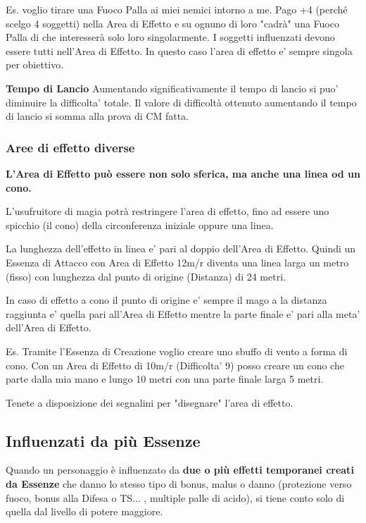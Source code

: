 \documentclass[a4paper,11pt,twoside,openany]{book}
\begin{document}
Es. voglio tirare una Fuoco Palla ai miei nemici intorno a me. Pago +4 (perché scelgo 4 soggetti) nella Area di Effetto e su ognuno di loro "cadrà" una Fuoco Palla di che interesserà solo loro singolarmente. I soggetti influenzati devono essere tutti nell'Area di Effetto. In questo caso l'area di effetto e' sempre singola per obiettivo.


\textbf{Tempo di Lancio}  
Aumentando significativamente il tempo di lancio  si puo' diminuire la difficolta' totale.
Il valore di difficoltà ottenuto aumentando il tempo di lancio si somma alla prova di CM fatta.

\subsubsection{Aree di effetto diverse}

\label{aree-di-effetto-diverse}

\textbf{L'Area di Effetto può essere non solo sferica, ma anche una linea od un cono.}

L'usufruitore di magia potrà restringere l'area di effetto, fino ad essere uno spicchio (il cono) della circonferenza iniziale oppure una linea.

La lunghezza dell'effetto in linea e' pari al doppio dell'Area di Effetto. Quindi un Essenza di Attacco con Area di Effetto 12m/r diventa una linea larga un metro (fisso) con lunghezza dal punto di origine (Distanza) di 24 metri.

In caso di effetto a cono il punto di origine e' sempre il mago a la distanza raggiunta e' quella pari all'Area di Effetto mentre la parte finale e' pari alla meta' dell'Area di Effetto.

Es. Tramite l'Essenza di Creazione voglio creare uno sbuffo di vento a forma di cono.
Con un Area di Effetto di 10m/r (Difficolta' 9) posso creare un cono che parte dalla mia mano e lungo 10 metri con una parte finale larga 5 metri.

Tenete a disposizione dei segnalini per "disegnare" l'area di effetto.

\subsection{Influenzati da più Essenze}

\label{influenzati-da-piu-essenze}

Quando un personaggio è influenzato da \textbf{due o più effetti temporanei creati da Essenze} che danno lo stesso tipo di bonus, malus o danno (protezione verso fuoco, bonus alla Difesa o TS... , multiple palle di acido), si tiene conto solo di quella dal livello di potere maggiore.
\end{document}
